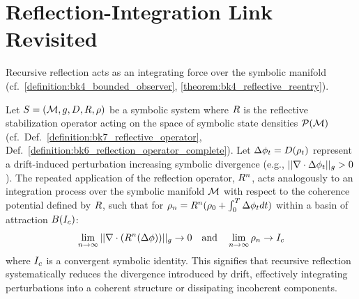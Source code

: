 \section{Reflection-Integration Link Revisited}
\label{sec:bk7_reflection_integration_link_revisited}
Recursive reflection acts as an integrating force over the symbolic manifold (cf.~\ref{definition:bk4_bounded_observer}, \ref{theorem:bk4_reflective_reentry}).
\begin{lemma}
\label{lemma:bk7_reflective_integration_lemma___formalized}
Let \(S = (\mathcal{M}, g, D, R, \rho)\) be a symbolic system where \(R\) is the reflective stabilization operator acting on the space of symbolic state densities \(\mathcal{P}(\mathcal{M})\) (cf.~Def.~\ref{definition:bk7_reflective_operator}, Def.~\ref{definition:bk6_reflection_operator_complete}). Let \(\Delta \phi_t = D(\rho_t)\) represent a drift-induced perturbation increasing symbolic divergence (e.g., \(||\nabla \cdot \Delta \phi_t||_g > 0\)). The repeated application of the reflection operator, \(R^n\), acts analogously to an integration process over the symbolic manifold \(\mathcal{M}\) with respect to the coherence potential defined by \(R\), such that for \(\rho_n = R^n(\rho_0 + \int_0^T \Delta \phi_t dt)\) within a basin of attraction \(B(I_c)\):
\[
\lim_{n\to\infty} ||\nabla \cdot (R^n(\Delta \phi))||_g \to 0 \quad \text{and} \quad \lim_{n\to\infty} \rho_n \to I_c
\]
where \(I_c\) is a convergent symbolic identity. This signifies that recursive reflection systematically reduces the divergence introduced by drift, effectively integrating perturbations into a coherent structure or dissipating incoherent components.
\end{lemma}

